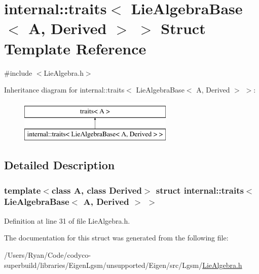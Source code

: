 \hypertarget{structinternal_1_1traits_3_01_lie_algebra_base_3_01_a_00_01_derived_01_4_01_4}{}\section{internal\+:\+:traits$<$ Lie\+Algebra\+Base$<$ A, Derived $>$ $>$ Struct Template Reference}
\label{structinternal_1_1traits_3_01_lie_algebra_base_3_01_a_00_01_derived_01_4_01_4}


{\ttfamily \#include $<$Lie\+Algebra.\+h$>$}

Inheritance diagram for internal\+:\+:traits$<$ Lie\+Algebra\+Base$<$ A, Derived $>$ $>$\+:\begin{figure}[H]
\begin{center}
\leavevmode
\includegraphics[height=2.000000cm]{structinternal_1_1traits_3_01_lie_algebra_base_3_01_a_00_01_derived_01_4_01_4}
\end{center}
\end{figure}


\subsection{Detailed Description}
\subsubsection*{template$<$class A, class Derived$>$\newline
struct internal\+::traits$<$ Lie\+Algebra\+Base$<$ A, Derived $>$ $>$}



Definition at line 31 of file Lie\+Algebra.\+h.



The documentation for this struct was generated from the following file\+:\begin{DoxyCompactItemize}
\item 
/\+Users/\+Ryan/\+Code/codyco-\/superbuild/libraries/\+Eigen\+Lgsm/unsupported/\+Eigen/src/\+Lgsm/\hyperlink{_lie_algebra_8h}{Lie\+Algebra.\+h}\end{DoxyCompactItemize}
